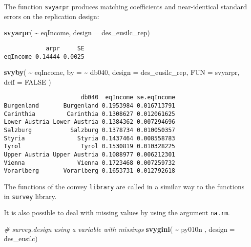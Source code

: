 \documentclass[
]{book}
\newenvironment{Shaded}{\begin{snugshade}}{\end{snugshade}}
\newcommand{\AttributeTok}[1]{\textcolor[rgb]{0.13,0.29,0.53}{#1}}
\newcommand{\CommentTok}[1]{\textcolor[rgb]{0.56,0.35,0.01}{\textit{#1}}}
\newcommand{\ConstantTok}[1]{\textcolor[rgb]{0.56,0.35,0.01}{#1}}
\newcommand{\FunctionTok}[1]{\textcolor[rgb]{0.13,0.29,0.53}{\textbf{#1}}}
\newcommand{\NormalTok}[1]{#1}
\newcommand{\SpecialCharTok}[1]{\textcolor[rgb]{0.81,0.36,0.00}{\textbf{#1}}}
\begin{document}
The function \texttt{svyarpr} produces matching coefficients and near-identical standard errors on the replication design:

\begin{Shaded}
\begin{Highlighting}[]
\FunctionTok{svyarpr}\NormalTok{( }\SpecialCharTok{\textasciitilde{}}\NormalTok{ eqIncome, }\AttributeTok{design =}\NormalTok{ des\_eusilc\_rep)}
\end{Highlighting}
\end{Shaded}

\begin{verbatim}
            arpr     SE
eqIncome 0.14444 0.0025
\end{verbatim}

\begin{Shaded}
\begin{Highlighting}[]
\FunctionTok{svyby}\NormalTok{(}
  \SpecialCharTok{\textasciitilde{}}\NormalTok{ eqIncome,}
  \AttributeTok{by =} \SpecialCharTok{\textasciitilde{}}\NormalTok{ db040,}
  \AttributeTok{design =}\NormalTok{ des\_eusilc\_rep,}
  \AttributeTok{FUN =}\NormalTok{ svyarpr,}
  \AttributeTok{deff =} \ConstantTok{FALSE}
\NormalTok{)}
\end{Highlighting}
\end{Shaded}

\begin{verbatim}
                      db040  eqIncome se.eqIncome
Burgenland       Burgenland 0.1953984 0.016713791
Carinthia         Carinthia 0.1308627 0.012061625
Lower Austria Lower Austria 0.1384362 0.007294696
Salzburg           Salzburg 0.1378734 0.010050357
Styria               Styria 0.1437464 0.008558783
Tyrol                 Tyrol 0.1530819 0.010328225
Upper Austria Upper Austria 0.1088977 0.006212301
Vienna               Vienna 0.1723468 0.007259732
Vorarlberg       Vorarlberg 0.1653731 0.012792618
\end{verbatim}

The functions of the convey \texttt{library} are called in a similar way to the functions in \texttt{survey} library.

It is also possible to deal with missing values by using the argument \texttt{na.rm}.

\begin{Shaded}
\begin{Highlighting}[]
\CommentTok{\# survey.design using a variable with missings}
\FunctionTok{svygini}\NormalTok{( }\SpecialCharTok{\textasciitilde{}}\NormalTok{ py010n , }\AttributeTok{design =}\NormalTok{ des\_eusilc)}
\end{Highlighting}
\end{Shaded}
\end{document}
